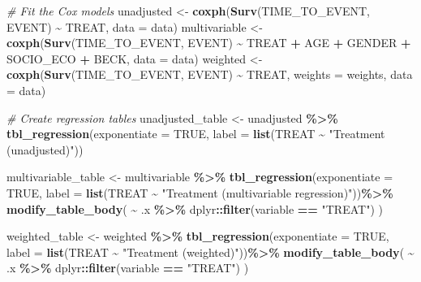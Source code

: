 \documentclass[
]{book}
\newenvironment{Shaded}{\begin{snugshade}}{\end{snugshade}}
\newcommand{\AttributeTok}[1]{\textcolor[rgb]{0.13,0.29,0.53}{#1}}
\newcommand{\CommentTok}[1]{\textcolor[rgb]{0.56,0.35,0.01}{\textit{#1}}}
\newcommand{\ConstantTok}[1]{\textcolor[rgb]{0.56,0.35,0.01}{#1}}
\newcommand{\FunctionTok}[1]{\textcolor[rgb]{0.13,0.29,0.53}{\textbf{#1}}}
\newcommand{\NormalTok}[1]{#1}
\newcommand{\OtherTok}[1]{\textcolor[rgb]{0.56,0.35,0.01}{#1}}
\newcommand{\SpecialCharTok}[1]{\textcolor[rgb]{0.81,0.36,0.00}{\textbf{#1}}}
\newcommand{\StringTok}[1]{\textcolor[rgb]{0.31,0.60,0.02}{#1}}
\begin{document}
\begin{Shaded}
\begin{Highlighting}[]
\CommentTok{\# Fit the Cox models}
\NormalTok{unadjusted }\OtherTok{\textless{}{-}} \FunctionTok{coxph}\NormalTok{(}\FunctionTok{Surv}\NormalTok{(TIME\_TO\_EVENT, EVENT) }\SpecialCharTok{\textasciitilde{}}\NormalTok{ TREAT, }\AttributeTok{data =}\NormalTok{ data)}
\NormalTok{multivariable }\OtherTok{\textless{}{-}} \FunctionTok{coxph}\NormalTok{(}\FunctionTok{Surv}\NormalTok{(TIME\_TO\_EVENT, EVENT) }\SpecialCharTok{\textasciitilde{}}\NormalTok{ TREAT }\SpecialCharTok{+}\NormalTok{ AGE }\SpecialCharTok{+}\NormalTok{ GENDER }\SpecialCharTok{+}\NormalTok{ SOCIO\_ECO }\SpecialCharTok{+}\NormalTok{ BECK, }\AttributeTok{data =}\NormalTok{ data)}
\NormalTok{weighted }\OtherTok{\textless{}{-}} \FunctionTok{coxph}\NormalTok{(}\FunctionTok{Surv}\NormalTok{(TIME\_TO\_EVENT, EVENT) }\SpecialCharTok{\textasciitilde{}}\NormalTok{ TREAT, }\AttributeTok{weights =}\NormalTok{ weights, }\AttributeTok{data =}\NormalTok{ data)}

\CommentTok{\# Create regression tables}
\NormalTok{unadjusted\_table }\OtherTok{\textless{}{-}}\NormalTok{ unadjusted }\SpecialCharTok{\%\textgreater{}\%} 
  \FunctionTok{tbl\_regression}\NormalTok{(}\AttributeTok{exponentiate =} \ConstantTok{TRUE}\NormalTok{,}
                 \AttributeTok{label =} \FunctionTok{list}\NormalTok{(TREAT }\SpecialCharTok{\textasciitilde{}} \StringTok{"Treatment (unadjusted)"}\NormalTok{))}

\NormalTok{multivariable\_table }\OtherTok{\textless{}{-}}\NormalTok{ multivariable }\SpecialCharTok{\%\textgreater{}\%} 
  \FunctionTok{tbl\_regression}\NormalTok{(}\AttributeTok{exponentiate =} \ConstantTok{TRUE}\NormalTok{,}
                 \AttributeTok{label =} \FunctionTok{list}\NormalTok{(TREAT }\SpecialCharTok{\textasciitilde{}} \StringTok{"Treatment (multivariable regression)"}\NormalTok{))}\SpecialCharTok{\%\textgreater{}\%}
  \FunctionTok{modify\_table\_body}\NormalTok{(}
    \SpecialCharTok{\textasciitilde{}}\NormalTok{ .x }\SpecialCharTok{\%\textgreater{}\%}\NormalTok{ dplyr}\SpecialCharTok{::}\FunctionTok{filter}\NormalTok{(variable }\SpecialCharTok{==} \StringTok{"TREAT"}\NormalTok{)}
\NormalTok{  )}

\NormalTok{weighted\_table }\OtherTok{\textless{}{-}}\NormalTok{ weighted }\SpecialCharTok{\%\textgreater{}\%} 
  \FunctionTok{tbl\_regression}\NormalTok{(}\AttributeTok{exponentiate =} \ConstantTok{TRUE}\NormalTok{,}
                 \AttributeTok{label =} \FunctionTok{list}\NormalTok{(TREAT }\SpecialCharTok{\textasciitilde{}} \StringTok{"Treatment (weighted)"}\NormalTok{))}\SpecialCharTok{\%\textgreater{}\%}
  \FunctionTok{modify\_table\_body}\NormalTok{(}
    \SpecialCharTok{\textasciitilde{}}\NormalTok{ .x }\SpecialCharTok{\%\textgreater{}\%}\NormalTok{ dplyr}\SpecialCharTok{::}\FunctionTok{filter}\NormalTok{(variable }\SpecialCharTok{==} \StringTok{"TREAT"}\NormalTok{)}
\NormalTok{  )}


\end{Highlighting}
\end{Shaded}
\end{document}
